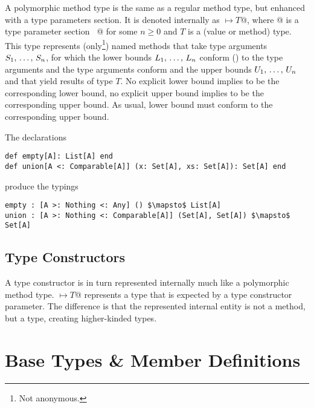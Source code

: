 A polymorphic method type is the same as a regular method type, but enhanced with a type parameters section. It is denoted internally as \lstinline@[$\tps$]$ \mapsto T$@, where \lstinline@[$\tps$]@ is a type parameter section ~\lstinline@[$\pm a_1$ >: $L_1$ <: $U_1$ $\commadots$ $\pm a_n$ >: $L_n$ <: $U_n$]@ for some $n \geq 0$ and $T$ is a (value or method) type. This type represents (only\footnote{Not anonymous.}) named methods that take type arguments $S_1 ,\, \ldots ,\, S_n$, for which the lower bounds $L_1 ,\, \ldots ,\, L_n$ conform () to the type arguments and the type arguments conform and the upper bounds $U_1 ,\, \ldots ,\, U_n$ and that yield results of type $T$. No explicit lower bound implies  to be the corresponding lower bound, no explicit upper bound implies  to be the corresponding upper bound. As usual, lower bound must conform to the corresponding upper bound. 

\example The declarations
\begin{lstlisting}[escapechar=@,deletekeywords={union}]
def empty[A]: List[A] end
def union[A <: Comparable[A]] (x: Set[A], xs: Set[A]): Set[A] end
\end{lstlisting}
produce the typings
\begin{lstlisting}[escapechar=@,deletekeywords={union}]
empty : [A >: Nothing <: Any] () $\mapsto$ List[A]
union : [A >: Nothing <: Comparable[A]] (Set[A], Set[A]) $\mapsto$ Set[A]
\end{lstlisting}





\subsection{Type Constructors}
\label{sec:type-constructors}

A type constructor is in turn represented internally much like a polymorphic method type. \lstinline@[$\pm a_1$ >: $L_1$ <: $U_1 \commadots \pm a_n$ >: $L_n$ <: $U_n$] $\mapsto T$@ represents a type that is expected by a type constructor parameter. The difference is that the represented internal entity is not a method, but a type, creating higher-kinded types. 





\section{Base Types \& Member Definitions}
\label{sec:base-types}
\label{sec:member-definitions}


